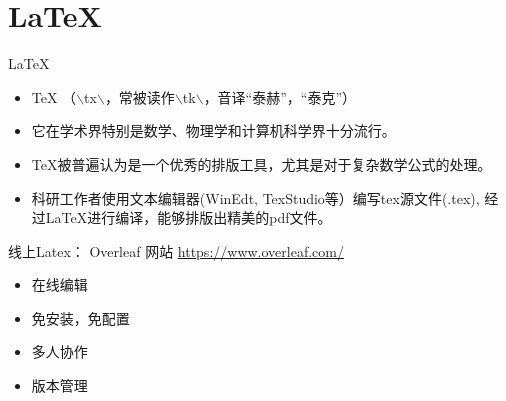 \documentclass[10pt]{ctexbeamer}
\begin{document}
\section{LaTeX}

\begin{frame}{LaTeX}

    \begin{itemize}
        \item 	TeX
        （$\backslash$t\textepsilon x$\backslash$，常被读作$\backslash$t\textepsilon k$\backslash$，音译“泰赫”，“泰克”）

        \item 它在学术界特别是数学、物理学和计算机科学界十分流行。
        \item
        TeX被普遍认为是一个优秀的排版工具，尤其是对于复杂数学公式的处理。
        \item
        科研工作者使用文本编辑器(WinEdt, TexStudio等）编写tex源文件(.tex),  经过LaTeX进行编译，能够排版出精美的pdf文件。
    \end{itemize}

    \begin{figure}

    \end{figure}

\end{frame}




\begin{frame}{线上Latex：  Overleaf}
    网站
    \href{https://www.overleaf.com?r=4c8832b9&rm=d&rs=b
    }{https://www.overleaf.com/
    }


    \begin{itemize}
        \item 在线编辑

        \item 免安装，免配置

        \item 多人协作

        \item 版本管理
    \end{itemize}
\end{frame}
\end{document}
